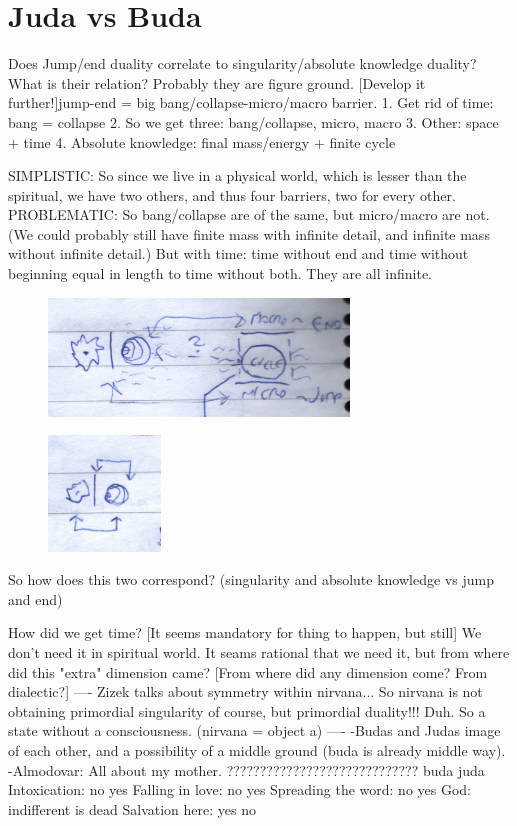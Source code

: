 \documentclass[10pt]{book}
\begin{document}
\chapter{Juda vs Buda}

Does Jump/end duality correlate to singularity/absolute knowledge duality? What is their relation? Probably they are figure ground. [Develop it further!]jump-end = big bang/collapse-micro/macro barrier.
1. Get rid of time: bang = collapse
2. So we get three: bang/collapse, micro, macro
3. Other: space + time
4. Absolute knowledge: final mass/energy + finite cycle

SIMPLISTIC:
So since we live in a physical world, which is lesser than the spiritual, we have two others, and thus four barriers, two for every other.
PROBLEMATIC:
So bang/collapse are of the same, but micro/macro are not. (We could probably still have finite mass with infinite detail, and infinite mass without infinite detail.) But with time: time without end and time without beginning equal in length to time without both. They are all infinite.
\begin{figure}[ht!]
\centering
\includegraphics[width=80mm]{scan07.jpg}
\label{overflow}
\end{figure}
\begin{figure}[ht!]
\centering
\includegraphics[width=30mm]{scan08.jpg}
\label{overflow}
\end{figure}
So how does this two correspond? (singularity and absolute knowledge vs jump and end)

How did we get time? [It seems mandatory for thing to happen, but still] We don't need it in spiritual world. It seams rational that we need it, but from where did this "extra" dimension came? [From where did any dimension come? From dialectic?] 
----
Zizek talks about symmetry within nirvana... So nirvana is not obtaining primordial singularity of course, but primordial duality!!! Duh. So a state without a consciousness. (nirvana = object a)
----
-Budas and Judas image of each other, and a possibility of a middle ground (buda is already middle way).
-Almodovar: All about my mother.
?????????????????????????????
					buda		juda
Intoxication:		no			yes
Falling in love:	no			yes
Spreading the word: no			yes
God:				indifferent	is dead
Salvation here:		yes			no
\end{document}
